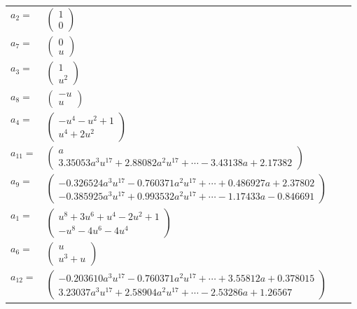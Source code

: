 \documentclass[1p]{elsarticle_modified}
\theoremstyle{definition}
\begin{document}
\begin{tabular}{m{7pt} m{180pt} m{7pt} m{180pt} }
\flushright $a_{2}=$&$\begin{pmatrix}1\\0\end{pmatrix}$ \\
\flushright $a_{7}=$&$\begin{pmatrix}0\\u\end{pmatrix}$ \\
\flushright $a_{3}=$&$\begin{pmatrix}1\\u^2\end{pmatrix}$ \\
\flushright $a_{8}=$&$\begin{pmatrix}- u\\u\end{pmatrix}$ \\
\flushright $a_{4}=$&$\begin{pmatrix}- u^4- u^2+1\\u^4+2 u^2\end{pmatrix}$ \\
\flushright $a_{11}=$&$\begin{pmatrix}a\\3.35053 a^{3} u^{17}+2.88082 a^{2} u^{17}+\cdots-3.43138 a+2.17382\end{pmatrix}$ \\
\flushright $a_{9}=$&$\begin{pmatrix}-0.326524 a^{3} u^{17}-0.760371 a^{2} u^{17}+\cdots+0.486927 a+2.37802\\-0.385925 a^{3} u^{17}+0.993532 a^{2} u^{17}+\cdots-1.17433 a-0.846691\end{pmatrix}$ \\
\flushright $a_{1}=$&$\begin{pmatrix}u^8+3 u^6+u^4-2 u^2+1\\- u^8-4 u^6-4 u^4\end{pmatrix}$ \\
\flushright $a_{6}=$&$\begin{pmatrix}u\\u^3+u\end{pmatrix}$ \\
\flushright $a_{12}=$&$\begin{pmatrix}-0.203610 a^{3} u^{17}-0.760371 a^{2} u^{17}+\cdots+3.55812 a+0.378015\\3.23037 a^{3} u^{17}+2.58904 a^{2} u^{17}+\cdots-2.53286 a+1.26567\end{pmatrix}$ \\

\end{tabular}
\end{document}
